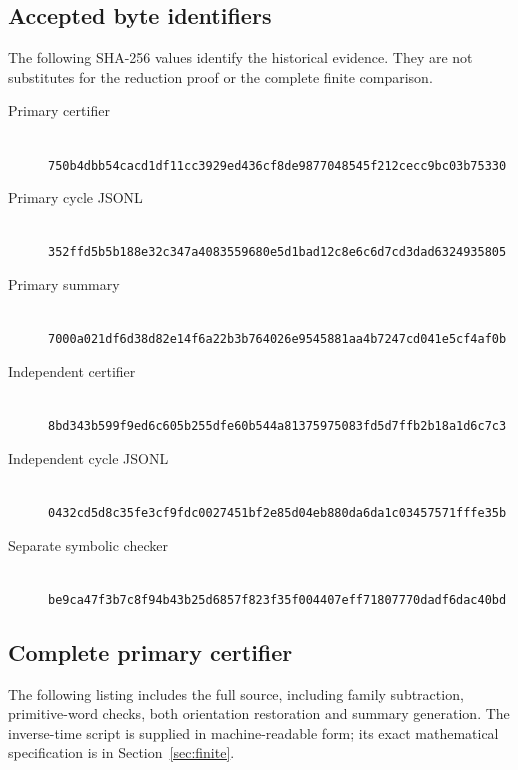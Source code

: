 \subsection{Accepted byte identifiers}
The following SHA-256 values identify the historical evidence.
They are not substitutes for the reduction proof or the
complete finite comparison.
\begin{description}
\item[Primary certifier]
\mbox{}\\\nolinkurl{750b4dbb54cacd1df11cc3929ed436cf8de9877048545f212cecc9bc03b75330}
\item[Primary cycle JSONL]
\mbox{}\\\nolinkurl{352ffd5b5b188e32c347a4083559680e5d1bad12c8e6c6d7cd3dad6324935805}
\item[Primary summary]
\mbox{}\\\nolinkurl{7000a021df6d38d82e14f6a22b3b764026e9545881aa4b7247cd041e5cf4af0b}
\item[Independent certifier]
\mbox{}\\\nolinkurl{8bd343b599f9ed6c605b255dfe60b544a81375975083fd5d7ffb2b18a1d6c7c3}
\item[Independent cycle JSONL]
\mbox{}\\\nolinkurl{0432cd5d8c35fe3cf9fdc0027451bf2e85d04eb880da6da1c03457571fffe35b}
\item[Separate symbolic checker]
\mbox{}\\\nolinkurl{be9ca47f3b7c8f94b43b25d6857f823f35f004407eff71807770dadf6dac40bd}
\end{description}

\subsection{Complete primary certifier}
The following listing includes the full source, including
family subtraction, primitive-word checks, both orientation
restoration and summary generation. The inverse-time script
is supplied in machine-readable form; its exact mathematical
specification is in Section~\ref{sec:finite}.

